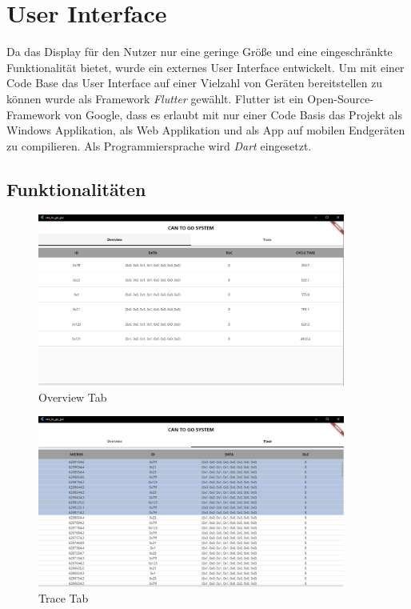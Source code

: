 \section{User Interface}
Da das Display für den Nutzer nur eine geringe Größe und eine eingeschränkte Funktionalität bietet, wurde ein externes User Interface entwickelt. Um mit einer Code Base das User Interface auf einer Vielzahl von Geräten bereitstellen zu können wurde als Framework \textit{Flutter} gewählt. Flutter ist ein Open-Source-Framework von Google, dass es erlaubt mit nur einer Code Basis das Projekt als Windows Applikation, als Web Applikation und als App auf mobilen Endgeräten zu compilieren. Als Programmiersprache wird \textit{Dart} eingesetzt.

\subsection{Funktionalitäten}
\begin{figure}[h]
  \centering
  \includegraphics[width=0.9\textwidth]{img/gui_overview.PNG}
  \caption{Overview Tab}
  \label{fig:gui_overview}
\end{figure}
\begin{figure}[ht]
  \centering
  \includegraphics[width=0.9\textwidth]{img/gui_trace.PNG}
  \caption{Trace Tab}
  \label{fig:gui_trace}
\end{figure}
